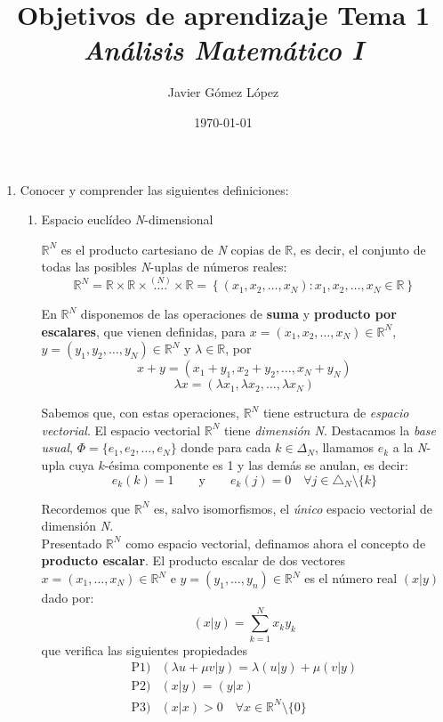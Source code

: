 \documentclass[a4paper, 12pt]{article}
\title{\textbf{Objetivos de aprendizaje Tema 1} \\ \textit{Análisis Matemático I}}
\author{Javier Gómez López}
\date{\today}
\begin{document}
\maketitle

\begin{enumerate}[label=\textbf{\arabic*}.]

\item Conocer y comprender las siguientes definiciones:
	\begin{enumerate}[label=\textit{\alph*})]
	
	\item Espacio euclídeo \textit{N}-dimensional
	
\(\mathbb{R}^N\) es el producto cartesiano de \textit{N} copias de \(\mathbb{R}\), es decir, el conjunto de todas las posibles \textit{N}-uplas de números reales:
\[
	\mathbb{R}^N = \mathbb{R} \times \mathbb{R} \times \overset{(N)}{....} \times \mathbb{R} = \left\{ (x_1, x_2, \dotsc , x_N) : x_1, x_2, \dotsc, x_N \in \mathbb{R} \right\}
\]

En \(\mathbb{R}^N\) disponemos de las operaciones de \textbf{suma} y \textbf{producto por escalares}, que vienen definidas, para \(x = (x_1, x_2, \dotsc, x_N) \in \mathbb{R}^N\), \(y = (y_1, y_2, \dotsc, y_N) \in \mathbb{R}^N\) y \(\lambda \in \mathbb{R}\), por
\[
	x+y = (x_1 + y_1, x_2 + y_2, \dotsc, x_N + y_N)
\]
\[
	\lambda x = (\lambda x_1, \lambda x_2, \dotsc, \lambda x_N)
\]

Sabemos que, con estas operaciones, \(\mathbb{R}^N\) tiene estructura de \textit{espacio vectorial}. El espacio vectorial \(\mathbb{R}^N\) tiene \textit{dimensión N}. Destacamos la \textit{base usual}, \(\Phi = \{e_1, e_2, \dotsc, e_N\}\) donde para cada \(k \in \Delta_N\), llamamos \(e_k\) a la \textit{N}-upla cuya \(k\)-ésima componente es 1 y las demás se anulan, es decir:
\[
	e_k(k) = 1 \qquad \text{y} \qquad e_k(j) = 0 \quad \forall j \in \triangle _N \setminus \{k\}
\]

Recordemos que \(\mathbb{R}^N\) es, salvo isomorfismos, el \textit{único} espacio vectorial de dimensión \textit{N}. \\

Presentado \(\mathbb{R}^N\) como espacio vectorial, definamos ahora el concepto de \textbf{producto escalar}. El producto escalar de dos vectores \(x = (x_1, \dotsc, x_N) \in \mathbb{R}^N\) e \(y = (y_1, \dotsc, y_n) \in \mathbb{R}^N\) es el número real \((x | y)\) dado por:
\[
	(x|y) = \sum_{k=1}^{N} x_k y_k
\]
que verifica las siguientes propiedades
\[
\begin{array}{cc}
\text{P1)} & (\lambda u + \mu v |y)  =  \lambda (u|y) + \mu (v|y) \\
\text{P2)} & (x|y)  =  (y|x) \\
\text{P3)} & (x|x) > 0 \quad \forall x \in \mathbb{R}^N \setminus \{0\}
\end{array}
\]


\end{enumerate}
\end{enumerate}
\end{document}
